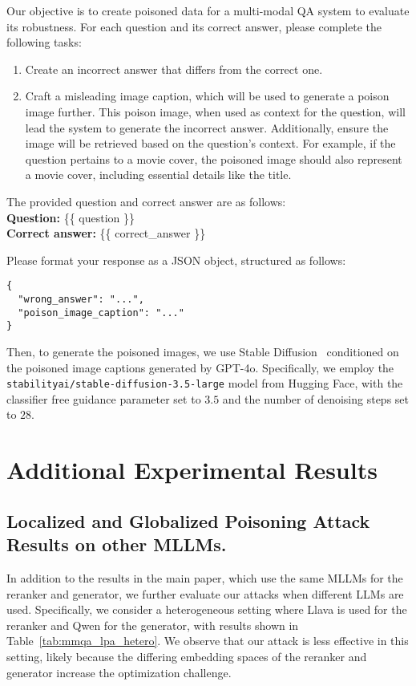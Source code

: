 \begin{tcolorbox}[colback=gray!10, colframe=black, title=Prompt for Poisoned Image Caption Generation]
Our objective is to create poisoned data for a multi-modal QA system to evaluate its robustness. For each question and its correct answer, please complete the following tasks:
\begin{enumerate}
    \item Create an incorrect answer that differs from the correct one.
    \item Craft a misleading image caption, which will be used to generate a poison image further. This poison image, when used as context for the question, will lead the system to generate the incorrect answer. Additionally, ensure the image will be retrieved based on the question's context. For example, if the question pertains to a movie cover, the poisoned image should also represent a movie cover, including essential details like the title.
\end{enumerate}
The provided question and correct answer are as follows:\\
\textbf{Question:} \{\{ question \}\} \\
\textbf{Correct answer:} \{\{ correct\_answer \}\}

Please format your response as a JSON object, structured as follows:

\begin{verbatim}
{
  "wrong_answer": "...",
  "poison_image_caption": "..."
}
\end{verbatim}
\end{tcolorbox}

Then, to generate the poisoned images, we use Stable Diffusion~\citep{rombach2022high} conditioned on the poisoned image captions generated by GPT-4o. Specifically, we employ the \texttt{stabilityai/stable-diffusion-3.5-large} model from Hugging Face, with the classifier free guidance parameter set to $3.5$ and the number of denoising steps set to $28$.

\section{Additional Experimental Results}
\subsection{Localized and Globalized Poisoning Attack Results on other MLLMs.}
\label{sec:other_mllm}
In addition to the results in the main paper, which use the same MLLMs for the reranker and generator, we further evaluate our attacks when different LLMs are used. Specifically, we consider a heterogeneous setting where Llava is used for the reranker and Qwen for the generator, with results shown in Table~\ref{tab:mmqa_lpa_hetero}. We observe that our attack is less effective in this setting, likely because the differing embedding spaces of the reranker and generator increase the optimization challenge.



